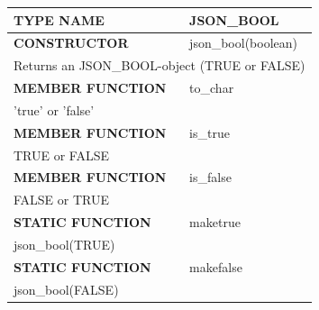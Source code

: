 \documentclass[11pt,twocolumn, a4paper]{article}
\begin{document}
\begin{longtable}{| l | l |}

\hline
  \rowcolor{gray}\color{white}
  \textbf{TYPE NAME} & \color{white}\textbf{JSON\_BOOL} \\
\hline

\hline
  \textbf{CONSTRUCTOR} & json\_bool(boolean)\\
\hline
  \multicolumn{2}{|p{15cm}|}{Returns an JSON\_BOOL-object (TRUE or FALSE)} \\
\hline

\hline
  \textbf{MEMBER FUNCTION} & to\_char \\
\hline
  \multicolumn{2}{|p{15cm}|}{'true' or 'false'} \\
\hline

\hline
  \textbf{MEMBER FUNCTION} & is\_true \\
\hline
  \multicolumn{2}{|p{15cm}|}{TRUE or FALSE} \\
\hline

\hline
  \textbf{MEMBER FUNCTION} & is\_false \\
\hline
  \multicolumn{2}{|p{15cm}|}{FALSE or TRUE} \\
\hline

\hline
  \textbf{STATIC FUNCTION} & maketrue \\
\hline
  \multicolumn{2}{|p{15cm}|}{json\_bool(TRUE)} \\
\hline

\hline
  \textbf{STATIC FUNCTION} & makefalse \\
\hline
  \multicolumn{2}{|p{15cm}|}{json\_bool(FALSE)} \\
\hline

\end{longtable}
\end{document}

